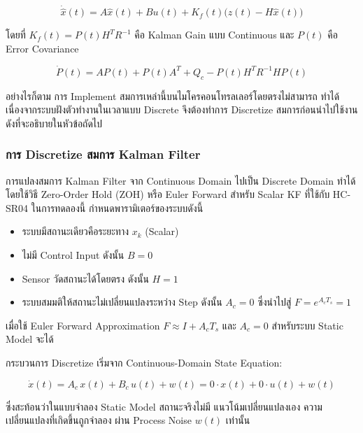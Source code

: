 \begin{equation}
    \dot{\hat{x}}(t) = A\hat{x}(t) + Bu(t) + K_f(t)\bigl(z(t) - H\hat{x}(t)\bigr)
    \label{eq:kalman_bucy}
\end{equation}

โดยที่ $K_f(t) = P(t)H^TR^{-1}$ คือ Kalman Gain แบบ Continuous
และ $P(t)$ คือ Error Covariance 

\begin{equation}
    \dot{P}(t) = AP(t) + P(t)A^T + Q_c - P(t)H^TR^{-1}HP(t)
    \label{eq:riccati}
\end{equation}

อย่างไรก็ตาม การ Implement สมการเหล่านี้บนไมโครคอนโทรลเลอร์โดยตรงไม่สามารถ
ทำได้ เนื่องจากระบบฝังตัวทำงานในเวลาแบบ Discrete จึงต้องทำการ Discretize
สมการก่อนนำไปใช้งาน ดังที่จะอธิบายในหัวข้อถัดไป

\subsubsection{การ Discretize สมการ Kalman Filter}

การแปลงสมการ Kalman Filter จาก Continuous Domain ไปเป็น Discrete Domain
ทำได้โดยใช้วิธี Zero-Order Hold (ZOH) หรือ Euler Forward
สำหรับ Scalar KF ที่ใช้กับ HC-SR04 ในการทดลองนี้
กำหนดพารามิเตอร์ของระบบดังนี้

\begin{itemize}
    \item ระบบมีสถานะเดียวคือระยะทาง $x_k$ (Scalar)
    \item ไม่มี Control Input ดังนั้น $B = 0$
    \item Sensor วัดสถานะได้โดยตรง ดังนั้น $H = 1$
    \item ระบบสมมติให้สถานะไม่เปลี่ยนแปลงระหว่าง Step
    ดังนั้น $A_c = 0$ ซึ่งนำไปสู่ $F = e^{A_c T_s} = 1$
\end{itemize}

เมื่อใช้ Euler Forward Approximation $F \approx I + A_c T_s$
และ $A_c = 0$ สำหรับระบบ Static Model จะได้

กระบวนการ Discretize เริ่มจาก Continuous-Domain State Equation:

\begin{equation}
    \dot{x}(t) = A_c\,x(t) + B_c\,u(t) + w(t)
    = 0 \cdot x(t) + 0 \cdot u(t) + w(t)
    \label{eq:scalar_continuous}
\end{equation}

ซึ่งสะท้อนว่าในแบบจำลอง Static Model สถานะจริงไม่มี
แนวโน้มเปลี่ยนแปลงเอง ความเปลี่ยนแปลงที่เกิดขึ้นถูกจำลอง
ผ่าน Process Noise $w(t)$ เท่านั้น

